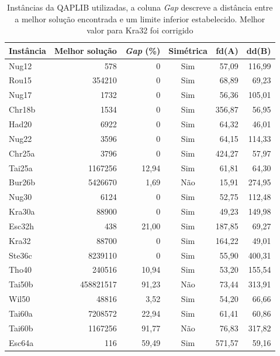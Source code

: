 \begin{table}[H]
  \caption{Instâncias da QAPLIB utilizadas\label{qapinst},
 a coluna
\textit{Gap} descreve a distância entre a melhor solução encontrada e
um limite inferior estabelecido. Melhor valor para Kra32 foi corrigido}
  \centering
  \begin{tabular}{l r r c r r}
    \toprule
    Instância & Melhor solução & \textit{Gap} (\%) & Simétrica & fd(A) & dd(B)\\
    \midrule
    Nug12 & 578 & 0 & Sim & 57,09 & 116,99\\
    Rou15 & 354210 & 0 & Sim & 68,89 & 69,23 \\
    Nug17 & 1732 & 0 & Sim & 56,36 & 105,01 \\
    Chr18b & 1534 & 0 & Sim & 356,87 & 56,95 \\
    Had20 & 6922 & 0 & Sim & 64,32 & 46,01 \\
    Nug22 & 3596 & 0 & Sim & 64,15 & 114,33\\
    Chr25a & 3796 & 0 & Sim & 424,27 & 57,97 \\
    Tai25a & 1167256 & 12,94 & Sim & 61,81 & 64,30\\
    Bur26b & 5426670 & 1,69 & Não & 15,91 & 274,95 \\
    Nug30 & 6124 & 0 & Sim & 52,75 & 112,48 \\
    Kra30a & 88900 & 0 & Sim & 49,23 & 149,98 \\
    Esc32h & 438 & 21,00 & Sim & 187,85 & 69,27 \\
    Kra32  & 88700 & 0 & Sim & 164,22 & 49,01 \\
    Ste36c & 8239110 & 0 & Sim & 55,90 & 400,31 \\
    Tho40 & 240516 & 10,94 & Sim & 53,20 & 155,54 \\
    Tai50b & 458821517 & 91,23 & Não & 73,44 & 313,91 \\
    Wil50 & 48816 & 3,52 & Sim & 54,20 & 66,66 \\
    Tai60a & 7208572 & 22,94 & Sim & 61,41 & 60,86 \\
    Tai60b & 1167256 & 91,77 & Não & 76,83 & 317,82 \\
    Esc64a & 116 & 59,49 & Sim & 571,57 & 59,16 \\
    \bottomrule
  \end{tabular}
\end{table}

